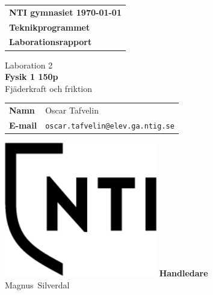 \documentclass[11p, titlepage, oneside, a4paper]{article}
\makeatletter
\def\inst{Teknikprogrammet}
\def\typeofdoc{Laborationsrapport}
\def\course{Fysik 1 150p}
\def\pretitle{Laboration 2}
\def\title{Fjäderkraft och friktion}
\def\name{Oscar Tafvelin}
\def\username{oscar.tafvelin}
\def\email{\username{}@elev.ga.ntig.se}
\def\graders{Magnus Silverdal}
\makeatother
\begin{document}
\begin{titlepage}
		\thispagestyle{empty}
		\begin{large}
			\begin{tabular}{@{}p{\textwidth}@{}}
				\textbf{NTI gymnasiet \hfill \today} \\
				\textbf{\inst} \\
				\textbf{\typeofdoc} \\
			\end{tabular}
		\end{large}
		\vspace{10mm}
		\begin{center}
			\LARGE{\pretitle} \\
			\huge{\textbf{\course}}\\
			\vspace{10mm}
			\LARGE{\title} \\
			\vspace{15mm}
			\begin{large}
				\begin{tabular}{ll}
					\textbf{Namn} & \name \\
					\textbf{E-mail} & \texttt{\email} \\
				\end{tabular}
			\end{large}
			\vfill
            \includegraphics[width=0.5\textwidth]{images/NTI Gymnasiet_Symbol_print_svart.png}
			\vfill
            \large{\textbf{Handledare}}\\
			\mbox{\large{\graders}}
		\end{center}
	\end{titlepage}
\end{document}
